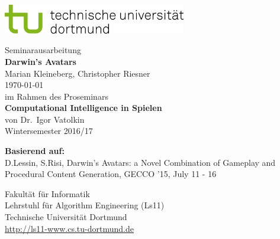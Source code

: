 \documentclass[a4paper,12pt,twoside]{article}
\begin{document}

\begin{titlepage}
\vspace*{-2cm}
\newlength{\links}
\setlength{\links}{-1.5cm} \sf \LARGE

\hspace*{\links}
\begin{minipage}{12.5cm}
\includegraphics[width=8cm]{tud_logo_rgb}
\end{minipage}

\vspace*{4cm}

\large
\begin{center}
{\Large Seminarausarbeitung} \\[1ex]
{\LARGE\textbf{Darwin's Avatars}}\\[3ex]
Marian Kleineberg, Christopher Riesner\\[1ex]
\today\\[7ex]
im Rahmen des Proseminars\\[1ex]
{\Large\textbf{Computational Intelligence in Spielen}}\\[1ex]
von Dr.~Igor Vatolkin\\[1ex]
Wintersemester 2016/17
\end{center}

\vspace*{5cm}
\hspace*{\links}
\begin{minipage}[b]{15cm}
\normalsize \raggedright

\textbf{Basierend auf:}\\
D.Lessin, S.Risi, Darwin's Avatars: a Novel Combination of Gameplay and Procedural Content Generation, GECCO '15, July 11 - 16
\end{minipage}

\vfill
\hspace*{\links}
\begin{minipage}[b]{8cm}
\normalsize \raggedright
Fakultät für Informatik\\
Lehrstuhl für Algorithm Engineering (Ls11)\\
Technische Universität Dortmund\\
\url{http://ls11-www.cs.tu-dortmund.de}
\end{minipage}

\end{titlepage}
\end{document}
